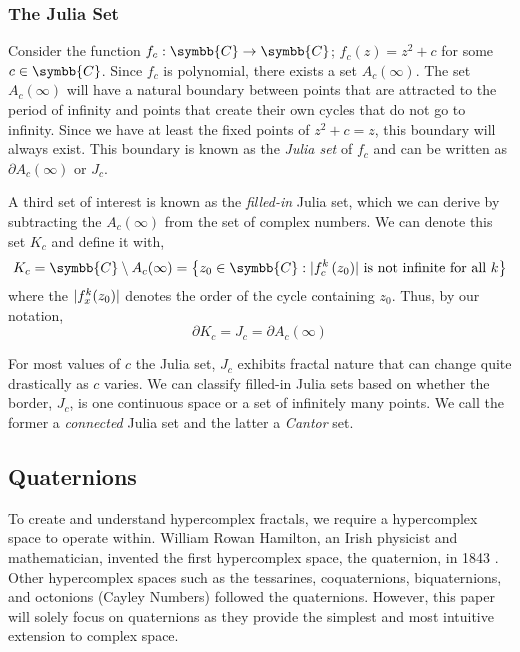 \documentclass[11pt,hidelinks]{article}
\numberwithin{equation}{section} %
\DeclarePairedDelimiter\abs{\lvert}{\rvert} %
\theoremstyle{bf}
\theoremstyle{indentbf}
\begin{document}
\subsubsection{The Julia Set}
\label{sec:org846b573}

Consider the function \(f_c : \symbb{C} \to \symbb{C}\); \(f_c(z) = z^2 + c\) for some \(c \in \symbb{C}\). Since \(f_c\) is polynomial, there exists a set \(A_c(\infty)\). The set \(A_c(\infty)\) will have a natural boundary between points that are attracted to the period of infinity and points that create their own cycles that do not go to infinity. Since we have at least the fixed points of \(z^2 + c = z\), this boundary will always exist. This boundary is known as the \emph{Julia set} of \(f_c\) and can be written as \(\partial A_c(\infty)\) or \(J_c\).

A third set of interest is known as the \emph{filled-in} Julia set, which we can derive by subtracting the \(A_c(\infty)\) from the set of complex numbers. We can denote this set \(K_c\) and define it with,
\begin{equation*}
    K_c = \symbb{C} \setminus A_c(\infty) = \left\{ z_0 \in \symbb{C}: \abs{f^k_c \left(z_0 \right)} \text{ is not infinite for all } k \right\}
\end{equation*}
where the \(\abs{f_x^k(z_0)}\) denotes the order of the cycle containing \(z_0\). Thus, by our notation,
\begin{equation*}
    \partial K_c = J_c = \partial A_c(\infty)
\end{equation*}

For most values of \(c\) the Julia set, \(J_c\) exhibits fractal nature that can change quite drastically as \(c\) varies. We can classify filled-in Julia sets based on whether the border, \(J_c\), is one continuous space or a set of infinitely many points. We call the former a \emph{connected} Julia set and the latter a \emph{Cantor} set.

\subsection{Quaternions}
\label{sec:org2e6ec8c}

To create and understand hypercomplex fractals, we require a hypercomplex space to operate within. William Rowan Hamilton, an Irish physicist and mathematician, invented the first hypercomplex space, the quaternion, in 1843 \cite{hamilton:1866}. Other hypercomplex spaces such as the tessarines, coquaternions, biquaternions, and octonions (Cayley Numbers) followed the quaternions. However, this paper will solely focus on quaternions as they provide the simplest and most intuitive extension to complex space.
\end{document}
